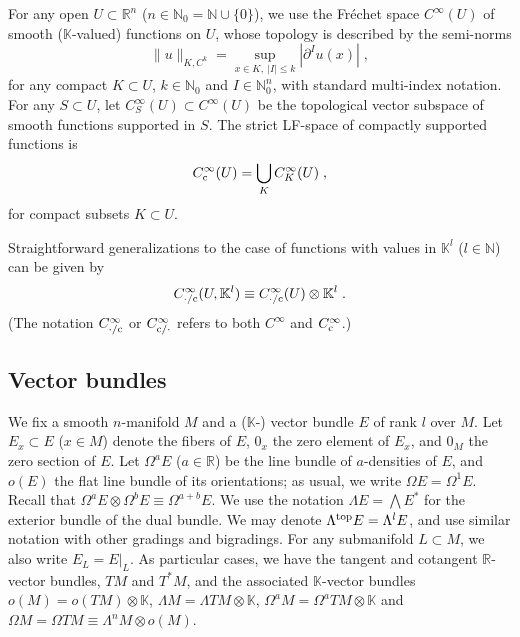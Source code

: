 \documentclass{memo-l}
\theoremstyle{plain}
\theoremstyle{definition}
\theoremstyle{remark}
\newcommand{\K}{\mathbb{K}}
\newcommand{\N}{\mathbb{N}}
\newcommand{\R}{\mathbb{R}}
\newcommand{\topd}{{\text{\rm top}}}
\newcommand{\co}{{\text{\rm c}}}
\newcommand{\Cinftyc}{C^\infty_{\text{\rm c}}}
\numberwithin{section}{chapter}
\numberwithin{equation}{section}%
\begin{document}
For any open $U\subset\R^n$ ($n\in\N_0=\N\cup\{0\}$), we use the Fr\'echet space $C^\infty(U)$ of smooth ($\K$-valued) functions on $U$, whose topology is described by the semi-norms
\begin{equation}\label{| u |_K C^k}
\|u\|_{K,C^k}=\sup_{x\in K,\ |I|\le k}|\partial^I u(x)|\;,
\end{equation}
for any compact $K\subset U$, $k\in\N_0$ and $I\in\N_0^n$, with standard multi-index notation. For any $S\subset U$, let $C^\infty_S(U)\subset C^\infty(U)$ be the topological vector subspace of smooth functions supported in $S$. The strict LF-space of compactly supported functions is
\begin{equation}\label{Cinftyc(U)}
\Cinftyc(U)=\bigcup_KC^\infty_K(U)\;,
\end{equation}
for compact subsets $K\subset U$.

Straightforward generalizations to the case of functions with values in $\K^l$ ($l\in\N$) can be given by 
\begin{equation}\label{C^infty_./c(U K^l) equiv C^infty_./c(U) otimes K^l}
C^\infty_{{\cdot}/\co}(U,\K^l)\equiv C^\infty_{{\cdot}/\co}(U)\otimes\K^l\;.
\end{equation}
(The notation $C^\infty_{{\cdot}/\co}$ or $C^\infty_{\co/{\cdot}}$ refers to both $C^\infty$ and $\Cinftyc$.)


\subsection{Vector bundles}\label{ss: vector bundless}

We fix a smooth $n$-manifold $M$ and a ($\K$-) vector bundle $E$ of rank $l$ over $M$. Let $E_x\subset E$ ($x\in M$) denote the fibers of $E$, $0_x$ the zero element of $E_x$, and $0_M$ the zero section of $E$. Let $\Omega^aE$  ($a\in\R$) be the line bundle of $a$-densities of $E$, and $o(E)$  the flat line bundle of its orientations; as usual, we write $\Omega E=\Omega^1E$.  Recall that $\Omega^aE\otimes\Omega^bE\equiv\Omega^{a+b}E$. We use the notation $\Lambda E=\bigwedge E^*$ for the exterior bundle of the dual bundle. We may denote $\Lambda^\topd E=\Lambda^lE$, and use similar notation with other gradings and bigradings.  \index{$\Lambda^\topd E$} For any submanifold $L\subset M$, we also write $E_L=E|_L$. As particular cases, we have the tangent and cotangent $\R$-vector bundles, $TM$ and $T^*M$, and the associated $\K$-vector bundles $o(M)=o(TM)\otimes\K$,  $\Lambda M=\Lambda TM\otimes\K$, $\Omega^aM=\Omega^aTM\otimes\K$ and $\Omega M=\Omega TM\equiv\Lambda^n M\otimes o(M)$.   
\end{document}
